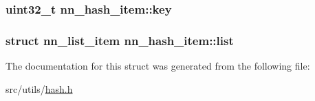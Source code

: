 \subsubsection[{key}]{\setlength{\rightskip}{0pt plus 5cm}uint32\+\_\+t nn\+\_\+hash\+\_\+item\+::key}\hypertarget{structnn__hash__item_a0c08a2cdf14f38f101faade8a1ee1101}{}\label{structnn__hash__item_a0c08a2cdf14f38f101faade8a1ee1101}
\subsubsection[{list}]{\setlength{\rightskip}{0pt plus 5cm}struct {\bf nn\+\_\+list\+\_\+item} nn\+\_\+hash\+\_\+item\+::list}\hypertarget{structnn__hash__item_ab52f9314ec727442f49da157796b0a89}{}\label{structnn__hash__item_ab52f9314ec727442f49da157796b0a89}


The documentation for this struct was generated from the following file\+:\begin{DoxyCompactItemize}
\item 
src/utils/\hyperlink{hash_8h}{hash.\+h}\end{DoxyCompactItemize}
